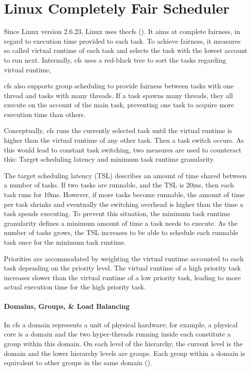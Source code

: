 \section{Linux Completely Fair Scheduler}
\label{state:cfs}


Since Linux version 2.6.23, Linux uses the\gls{cfs} (\cite{linux_cfs_doc}).
It aims at complete fairness, in regard to execution time provided to each task.
To achieve fairness, it measures so called virtual runtime of each task and
selects the task with the lowest account to run next.
Internally, \gls{cfs} uses a red-black tree to sort the tasks regarding virtual
runtime,

\gls{cfs} also supports group scheduling to provide fairness between tasks with one
thread and tasks with many threads.
If a task spawns many threads, they all execute on the account of the main
task, preventing one task to acquire more execution time than others.

Conceptually, \gls{cfs} runs the currently selected task until the virtual runtime is
higher than the virtual runtime of any other task.
Then a task switch occurs.
As this would lead to constant task switching, two measures are used to
counteract this: Target scheduling latency and minimum task runtime granularity.

The target scheduling latency (TSL) describes an amount of time shared between a
number of tasks.
If two tasks are runnable, and the TSL is 20ms, then each task runs for 10ms.
However, if more tasks become runnable, the amount of time per task shrinks and
eventually the switching overhead is higher than the time a task spends
executing.
To prevent this situation, the minimum task runtime granularity defines a
minimum amount of time a task needs to execute.
As the number of tasks grows, the TSL increases to be able to schedule each
runnable task once for the minimum task runtime.

Priorities are accommodated by weighting the virtual runtime accounted to each
task depending on the priority level.
The virtual runtime of a high priority task increases slower than the virtual
runtime of a low priority task, leading to more actual execution time for the
high priority task.

\paragraph{Domains, Groups, \& Load Balancing}
In \gls{cfs} a domain represents a unit of physical hardware;
for example, a physical core is a domain and the two hyper-threads running
inside each constitute a group within this domain.
On each level of the hierarchy, the current level is the domain and the lower
hierarchy levels are groups.
Each group within a domain is equivalent to other groups in the same domain
(\cite{lwn_sched_domains}).

